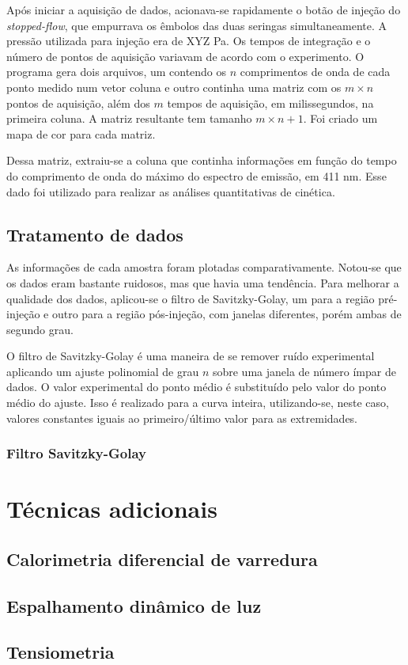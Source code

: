 			Após iniciar a aquisição de dados, acionava-se rapidamente o botão de injeção do \emph{stopped-flow}, que empurrava os êmbolos das duas seringas simultaneamente. A pressão utilizada para injeção era de XYZ Pa. Os tempos de integração e o número de pontos de aquisição variavam de acordo com o experimento. O programa gera dois arquivos, um contendo os $n$ comprimentos de onda de cada ponto medido num vetor coluna e outro continha uma matriz com os $m \times n$ pontos de aquisição, além dos $m$ tempos de aquisição, em milissegundos, na primeira coluna. A matriz resultante tem tamanho $m\times n+1$. Foi criado um mapa de cor para cada matriz.
			
			Dessa matriz, extraiu-se a coluna que continha informações em função do tempo do comprimento de onda do máximo do espectro de emissão, em 411 nm. Esse dado foi utilizado para realizar as análises quantitativas de cinética.
			
		\section{Tratamento de dados}
		
			As informações de cada amostra foram plotadas comparativamente. Notou-se que os dados eram bastante ruidosos, mas que havia uma tendência. Para melhorar a qualidade dos dados, aplicou-se o filtro de Savitzky-Golay, um para a região pré-injeção e outro para a região pós-injeção, com janelas diferentes, porém ambas de segundo grau.
			
			O filtro de Savitzky-Golay é uma maneira de se remover ruído experimental aplicando um ajuste polinomial de grau $n$ sobre uma janela de número ímpar de dados. O valor experimental do ponto médio é substituído pelo valor do ponto médio do ajuste. Isso é realizado para a curva inteira, utilizando-se, neste caso, valores constantes iguais ao primeiro/último valor para as extremidades.
		
			\subsection{Filtro Savitzky-Golay}
	\chapter{Técnicas adicionais}
		\section{Calorimetria diferencial de varredura}
		\section{Espalhamento dinâmico de luz}
		\section{Tensiometria}
